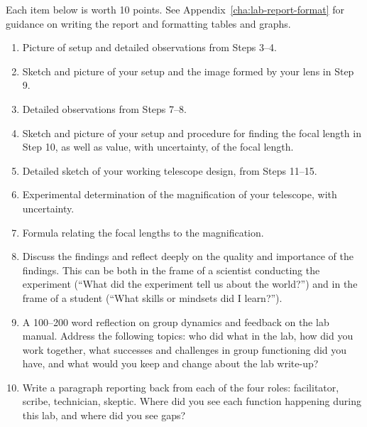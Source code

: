 Each item below is worth 10 points. See Appendix\ \ref{cha:lab-report-format} for guidance on writing the report and formatting tables and graphs.

\begin{enumerate}
	
	\item Picture of setup and detailed observations from Steps 3--4.
	
	\item Sketch and picture of your setup and the image formed by your lens in Step 9.
	
	\item Detailed observations from Steps 7--8.
	
	\item Sketch and picture of your setup and procedure for finding the focal length in Step 10, as well as value, with uncertainty, of the focal length.
	
	\item Detailed sketch of your working telescope design, from Steps 11--15.
	
	\item Experimental determination of the magnification of your telescope, with uncertainty.
	
	\item Formula relating the focal lengths to the magnification.
	
	\item Discuss the findings and reflect deeply on the quality and importance of the findings. This can be both in the frame of a scientist conducting the experiment (``What did the experiment tell us about the world?'') and in the frame of a student (``What skills or mindsets did I learn?'').
	
	\item A 100--200 word reflection on group dynamics and feedback on the lab manual. Address the following topics: who did what in the lab, how did you work together, what successes and challenges in group functioning did you have, and what would you keep and change about the lab write-up?
	
	\item Write a paragraph reporting back from each of the four roles: facilitator, scribe, technician, skeptic. Where did you see each function happening during this lab, and where did you see gaps?
\end{enumerate}


